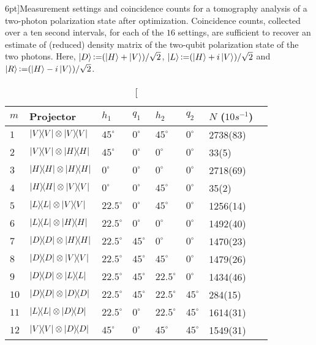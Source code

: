 \begin{table}[t!]
	\centering
	\caption[Measurement settings and doublce coincidence counts for a tomography analysis of a two-photon polarization state after optimization.][6pt]{Measurement settings and coincidence counts for a tomography analysis of a two-photon polarization state after optimization. Coincidence counts, collected over a ten second intervals, for each of the $16$ settings, are sufficient to recover an estimate of (reduced) density matrix of the two-qubit polarization state of the two photons. Here, ${\ket{D}\operatorname{\vcentcolon=}(\ket{H}+\ket{V})/\sqrt{2}}$, ${\ket{L}\operatorname{\vcentcolon=}(\ket{H}+i\ket{V})/\sqrt{2}}$ and ${\ket{R}\operatorname{\vcentcolon=}(\ket{H}-i\ket{V})/\sqrt{2}}$.}
	\begin{tabular}{llllllll}
		\toprule
		$m$ & Projector & $h_1$ & $q_1$ & $h_2$ & $q_2$ & $N$ ($10s^{-1}$) \\
		\toprule
		$1$  & $\op{V}\otimes\op{V}$ & $45^{\circ}$   & $0^{\circ}$  & $45^{\circ}$    & $0^{\circ}$   & 2738(83) \\
		$2$  & $\op{V}\otimes\op{H}$ & $45^{\circ}$   & $0^{\circ}$  & $0^{\circ}$     & $0^{\circ}$   & 33(5) \\
		$3$  & $\op{H}\otimes\op{H}$ & $0^{\circ}$    & $0^{\circ}$  & $0^{\circ}$     & $0^{\circ}$   & 2718(69) \\
		$4$  & $\op{H}\otimes\op{V}$ & $0^{\circ}$    & $0^{\circ}$  & $45^{\circ}$    & $0^{\circ}$   & 35(2) \\
		$5$  & $\op{L}\otimes\op{V}$ & $22.5^{\circ}$ & $0^{\circ}$  & $45^{\circ}$    & $0^{\circ}$   & 1256(14) \\
		$6$  & $\op{L}\otimes\op{H}$ & $22.5^{\circ}$ & $0^{\circ}$  & $0^{\circ}$     & $0^{\circ}$   & 1492(40) \\
		$7$  & $\op{D}\otimes\op{H}$ & $22.5^{\circ}$ & $45^{\circ}$ & $0^{\circ}$     & $0^{\circ}$   & 1470(23) \\
		$8$  & $\op{D}\otimes\op{V}$ & $22.5^{\circ}$ & $45^{\circ}$ & $45^{\circ}$    & $0^{\circ}$   & 1479(26) \\
		$9$  & $\op{D}\otimes\op{L}$ & $22.5^{\circ}$ & $45^{\circ}$ & $22.5^{\circ}$  & $0^{\circ}$   & 1434(46) \\
		$10$ & $\op{D}\otimes\op{D}$ & $22.5^{\circ}$ & $45^{\circ}$ & $22.5^{\circ}$  & $45^{\circ}$  & 284(15) \\
		$11$ & $\op{L}\otimes\op{D}$ & $22.5^{\circ}$ & $0^{\circ}$  & $22.5^{\circ}$  & $45^{\circ}$  & 1614(31) \\
		$12$ & $\op{V}\otimes\op{D}$ & $45^{\circ}$   & $0^{\circ}$  & $45^{\circ}$    & $45^{\circ}$  & 1549(31)\\

\end{tabular}
\end{table}
